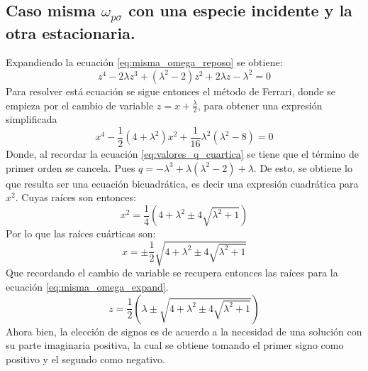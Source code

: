 \documentclass[12pt]{article}
\begin{document}
\subsection*{Caso misma $\omega_{p\sigma}$ con una especie incidente y la otra estacionaria.}
Expandiendo la ecuación \ref{eq:misma_omega_reposo} se obtiene:
\begin{equation}
\label{eq:misma_omega_expand}
z^4 -2\lambda z^3 +(\lambda^2 -2)z^2 + 2\lambda z -\lambda^2=0
\end{equation}
Para resolver está ecuación se sigue entonces el método de Ferrari, donde se empieza por el cambio de variable $z=x+\frac{\lambda}{2}$, para obtener una expresión simplificada
\begin{equation}
x^4 - \frac{1}{2}(4 + \lambda^2)x^2 + \frac{1}{16}\lambda^2 (\lambda^2 -8)=0
\end{equation}
Donde, al recordar la ecuación \ref{eq:valores_q_cuartica} se tiene que el término de primer orden se cancela. Pues $q=-\lambda^3 + \lambda (\lambda^2 -2) +\lambda$. De esto, se obtiene lo que resulta ser una ecuación bicuadrática, es decir una expresión cuadrática para $x^2$. Cuyas raíces son entonces:
\begin{equation}
x^2 = \frac{1}{4}(4 + \lambda^2 \pm 4\sqrt{ \lambda^2 +1})
\end{equation}
Por lo que las raíces cuárticas son:
\begin{equation}
x= \pm \frac{1}{2}\sqrt{4 + \lambda^2 \pm 4\sqrt{ \lambda^2 +1}}
\end{equation}
Que recordando el cambio de variable se recupera entonces las raíces para la ecuación \ref{eq:misma_omega_expand}.
\begin{equation}
z = \frac{1}{2}\left(\lambda \pm \sqrt{4 + \lambda^2 \pm 4\sqrt{ \lambda^2 +1}}\right)
\end{equation}
Ahora bien, la elección de signos es de acuerdo a la necesidad de una solución con su parte imaginaria positiva, la cual se obtiene tomando el primer signo como positivo y el segundo como negativo.
\end{document}

